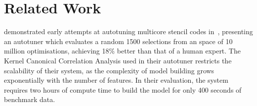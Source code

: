 \documentclass[nonatbib,preprint,10pt]{sigplanconf}
\begin{document}
\section{Related Work}\label{sec:related}




\citeauthor{Ganapathi2009} demonstrated early attempts at autotuning
multicore stencil codes in~\cite{Ganapathi2009}, presenting an
autotuner which evaluates a random 1500 selections from an space of 10
million optimisations, achieving 18\% better than that of a human
expert. The Kernel Canonical Correlation Analysis used in their
autotuner restricts the scalability of their system, as the complexity
of model building grows exponentially with the number of features. In
their evaluation, the system requires two hours of compute time to
build the model for only 400 seconds of benchmark data.
\end{document}
